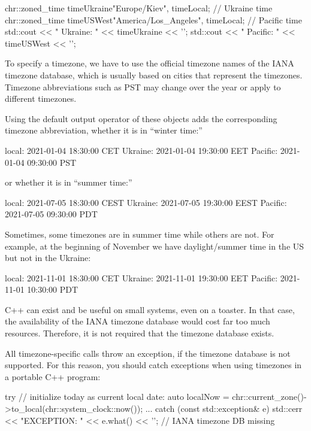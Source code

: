 \begin{cpp}
chr::zoned_time timeUkraine{"Europe/Kiev", timeLocal}; // Ukraine time
chr::zoned_time timeUSWest{"America/Los_Angeles", timeLocal}; // Pacific time
std::cout << " Ukraine: " << timeUkraine << '\n';
std::cout << " Pacific: " << timeUSWest << '\n';
\end{cpp}

To specify a timezone, we have to use the official timezone names of the IANA timezone database, which is usually based on cities that represent the timezones. Timezone abbreviations such as PST may change over the year or apply to different timezones.

Using the default output operator of these objects adds the corresponding timezone abbreviation, whether it is in “winter time:”

\begin{shell}
local:   2021-01-04 18:30:00 CET
Ukraine: 2021-01-04 19:30:00 EET
Pacific: 2021-01-04 09:30:00 PST
\end{shell}

or whether it is in “summer time:”

\begin{shell}
local:   2021-07-05 18:30:00 CEST
Ukraine: 2021-07-05 19:30:00 EEST
Pacific: 2021-07-05 09:30:00 PDT
\end{shell}

Sometimes, some timezones are in summer time while others are not. For example, at the beginning of November we have daylight/summer time in the US but not in the Ukraine:

\begin{shell}
local:   2021-11-01 18:30:00 CET
Ukraine: 2021-11-01 19:30:00 EET
Pacific: 2021-11-01 10:30:00 PDT
\end{shell}


C++ can exist and be useful on small systems, even on a toaster. In that case, the availability of the IANA timezone database would cost far too much resources. Therefore, it is not required that the timezone database exists.

All timezone-specific calls throw an exception, if the timezone database is not supported. For this reason, you should catch exceptions when using timezones in a portable C++ program:

\begin{cpp}
try {
	// initialize today as current local date:
	auto localNow = chr::current_zone()->to_local(chr::system_clock::now());
	...
}
catch (const std::exception& e) {
	std::cerr << "EXCEPTION: " << e.what() << '\n'; // IANA timezone DB missing
}
\end{cpp}

